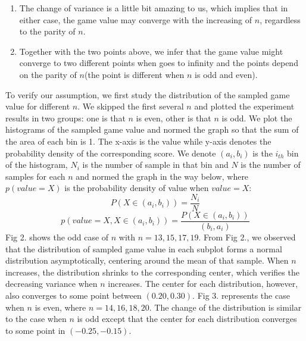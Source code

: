 \documentclass{article}
\begin{document}
\begin{spacing}{1.4}
\begin{enumerate}
    \item The change of variance is a little bit amazing to us, which implies that in either case, the game value may converge with the increasing of $n$, regardless to the parity of $n$.
    \item Together with the two points above, we infer that the game value might converge to two different points when goes to infinity and the points depend on the parity of $n$(the point is different when $n$ is odd and even).
\end{enumerate}
To verify our assumption, we first study the distribution of the sampled game value for different $n$. We skipped the first several $n$ and plotted the experiment results in two groups: one is that $n$ is even, other is that $n$ is odd.\newline
We plot the histograms of the sampled game value and normed the graph so that the sum of the area of each bin is 1. The x-axis is the value while y-axis denotes the probability density of the corresponding score. We denote $(a_i,b_i)$ is the $i_{th}$ bin of the histogram, $N_i$ is the number of sample in that bin and $N$ is the number of samples for each $n$ and normed the graph in the way below, where $p(value=X)$ is the probability density of value when $value = X$:
\begin{equation*}
    P(X \in (a_i,b_i)) = \frac{N_i}{N}
\end{equation*}
\begin{equation*}
    p(value = X, X \in (a_i,b_i)) = \frac{P(X \in (a_i,b_i))}{(b_i,a_i)}
\end{equation*}
Fig 2. shows the odd case of $n$ with $n=13,15,17,19$. From Fig 2., we observed that the distribution of sampled game value in each subplot forms a normal distribution asymptotically, centering around the mean of that sample. When $n$ increases, the distribution shrinks to the corresponding center, which verifies the decreasing variance when $n$ increases. The center for each distribution, however, also converges to some point between $(0.20,0.30)$.\newline
Fig 3. represents the case when $n$ is even, where $n = 14, 16, 18, 20$. The change of the distribution is similar to the case when $n$ is odd except that the center for each distribution converges to some point in $(-0.25, -0.15)$. \newline


\end{spacing}
\end{document}
